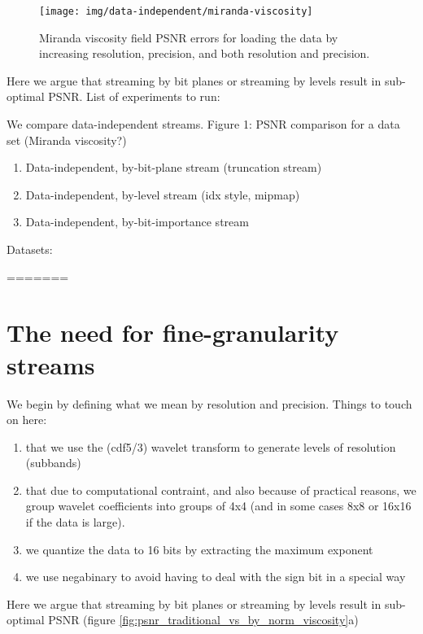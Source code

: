 \begin{figure}
        \centering
        \texttt{[image: img/data-independent/miranda-viscosity]}
        \caption{Miranda viscosity field PSNR errors for loading the data by increasing resolution,
                 precision, and both resolution and precision.}
        \label{fig:viscosity-psnr}
\end{figure}



Here we argue that streaming by bit planes or streaming by levels result in sub-optimal PSNR.
List of experiments to run:

We compare data-independent streams. Figure 1: PSNR comparison for a data set (Miranda viscosity?)
    \begin{enumerate}
      \item Data-independent, by-bit-plane stream (truncation stream)
      \item Data-independent, by-level stream (idx style, mipmap)
      \item Data-independent, by-bit-importance stream
    \end{enumerate}


Datasets:

=======
\section{The need for fine-granularity streams}
We begin by defining what we mean by resolution and precision. Things to touch on here:

\begin{enumerate}
  \item that we use the (cdf5/3) wavelet transform to generate levels of resolution (subbands)
  \item that due to computational contraint, and also because of practical reasons, we group wavelet coefficients into groups of 4x4 (and in some cases 8x8 or 16x16 if the data is large).
  \item we quantize the data to 16 bits by extracting the maximum exponent
  \item we use negabinary to avoid having to deal with the sign bit in a special way
\end{enumerate}

Here we argue that streaming by bit planes or streaming by levels result in sub-optimal PSNR (figure \ref{fig:psnr_traditional_vs_by_norm_viscosity}a)

